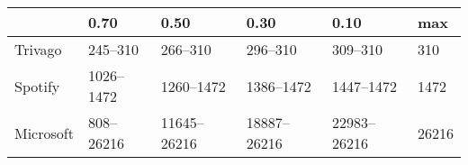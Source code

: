 \begin{tabular}{llllll}
\toprule
 & \num{0.70} & \num{0.50} & \num{0.30} & \num{0.10} & max \\
\midrule
Trivago & \numrange{245}{310} & \numrange{266}{310} & \numrange{296}{310} & \numrange{309}{310} & \num{310} \\
Spotify & \numrange{1026}{1472} & \numrange{1260}{1472} & \numrange{1386}{1472} & \numrange{1447}{1472} & \num{1472} \\
Microsoft & \numrange{808}{26216} & \numrange{11645}{26216} & \numrange{18887}{26216} & \numrange{22983}{26216} & \num{26216} \\
\bottomrule
\end{tabular}
